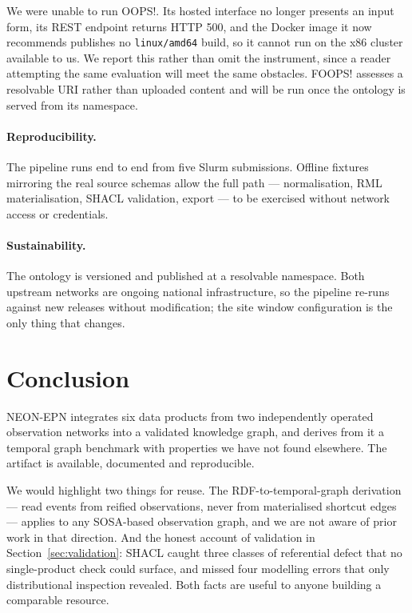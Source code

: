 We were unable to run OOPS!. Its hosted interface no longer presents an input
form, its REST endpoint returns HTTP 500, and the Docker image it now
recommends publishes no \texttt{linux/amd64} build, so it cannot run on the
x86 cluster available to us. We report this rather than omit the instrument,
since a reader attempting the same evaluation will meet the same obstacles.
FOOPS! assesses a resolvable URI rather than uploaded content and will be run
once the ontology is served from its namespace.

\paragraph{Reproducibility.} The pipeline runs end to end from five Slurm
submissions. Offline fixtures mirroring the real source schemas allow the full
path --- normalisation, RML materialisation, SHACL validation, export --- to be
exercised without network access or credentials.

\paragraph{Sustainability.} The ontology is versioned and published at a
resolvable namespace. Both upstream networks are ongoing national
infrastructure, so the pipeline re-runs against new releases without
modification; the site window configuration is the only thing that changes.

\section{Conclusion}

NEON-EPN integrates six data products from two independently operated
observation networks into a validated knowledge graph, and derives from it a
temporal graph benchmark with properties we have not found elsewhere. The
artifact is available, documented and reproducible.

We would highlight two things for reuse. The RDF-to-temporal-graph derivation
--- read events from reified observations, never from materialised shortcut
edges --- applies to any SOSA-based observation graph, and we are not aware of
prior work in that direction. And the honest account of validation in
Section~\ref{sec:validation}: SHACL caught three classes of referential defect
that no single-product check could surface, and missed four modelling errors
that only distributional inspection revealed. Both facts are useful to anyone
building a comparable resource.

